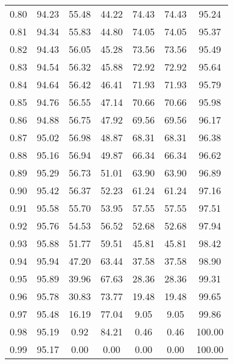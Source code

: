 \begin{tabular}{|c|c|c|c|c|c|c|}
      0.80 &     94.23 &     55.48 &      44.22 &   74.43 &      74.43 &         95.24 \\
      0.81 &     94.34 &     55.83 &      44.80 &   74.05 &      74.05 &         95.37 \\
      0.82 &     94.43 &     56.05 &      45.28 &   73.56 &      73.56 &         95.49 \\
      0.83 &     94.54 &     56.32 &      45.88 &   72.92 &      72.92 &         95.64 \\
      0.84 &     94.64 &     56.42 &      46.41 &   71.93 &      71.93 &         95.79 \\
      0.85 &     94.76 &     56.55 &      47.14 &   70.66 &      70.66 &         95.98 \\
      0.86 &     94.88 &     56.75 &      47.92 &   69.56 &      69.56 &         96.17 \\
      0.87 &     95.02 &     56.98 &      48.87 &   68.31 &      68.31 &         96.38 \\
      0.88 &     95.16 &     56.94 &      49.87 &   66.34 &      66.34 &         96.62 \\
      0.89 &     95.29 &     56.73 &      51.01 &   63.90 &      63.90 &         96.89 \\
      0.90 &     95.42 &     56.37 &      52.23 &   61.24 &      61.24 &         97.16 \\
      0.91 &     95.58 &     55.70 &      53.95 &   57.55 &      57.55 &         97.51 \\
      0.92 &     95.76 &     54.53 &      56.52 &   52.68 &      52.68 &         97.94 \\
      0.93 &     95.88 &     51.77 &      59.51 &   45.81 &      45.81 &         98.42 \\
      0.94 &     95.94 &     47.20 &      63.44 &   37.58 &      37.58 &         98.90 \\
      0.95 &     95.89 &     39.96 &      67.63 &   28.36 &      28.36 &         99.31 \\
      0.96 &     95.78 &     30.83 &      73.77 &   19.48 &      19.48 &         99.65 \\
      0.97 &     95.48 &     16.19 &      77.04 &    9.05 &       9.05 &         99.86 \\
      0.98 &     95.19 &      0.92 &      84.21 &    0.46 &       0.46 &        100.00 \\
      0.99 &     95.17 &      0.00 &       0.00 &    0.00 &       0.00 &        100.00 \\
\bottomrule
\end{tabular}
